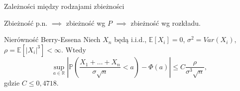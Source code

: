\documentclass[avery5371,grid,frame]{flashcards}
\begin{document}
\begin{flashcard}[Twierdzenie]{Zależności między rodzajami zbieżności}

\smallskip
Zbieżność p.n. $\implies$ zbieżność wg $P$ $\implies$ zbieżność wg rozkładu.
\end{flashcard}

\begin{flashcard}[Twierdzenie]{Nierówność Berry-Essena}
	\smallskip
	Niech $X_n$ będą i.i.d., $\mathbb{E}[X_i] = 0$, $\sigma^2 = Var(X_i)$, $\rho = \mathbb{E}[|X_i|^3] < \infty$. Wtedy
	$$ \sup_{a \in \mathbb{R}} \left | \mathbb{P}\left(\frac{X_1 + \dots + X_n}{\sigma \sqrt{n}} < a \right ) - \Phi(a) \right | \leq C \frac{\rho}{\sigma^3 \sqrt{n}},$$ gdzie $C \leq 0,4718$.
\end{flashcard}
\end{document}
